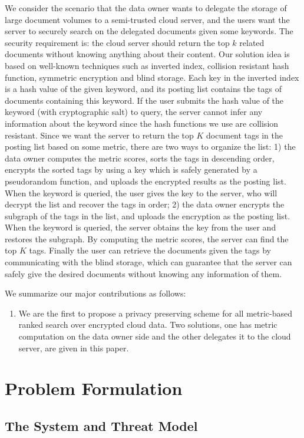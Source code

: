 \documentclass{IEEEtran}
\begin{document}
We consider the scenario that the data owner wants to delegate the storage of large document volumes to a semi-trusted cloud server, and the users want the server to securely search on the delegated documents given some keywords. The security requirement is: the cloud server should return the top $k$ related documents without knowing anything about their content. Our solution idea is based on well-known techniques such as inverted index, collision resistant hash function, symmetric encryption and blind storage. Each key in the inverted index is a hash value of the given keyword, and its posting list contains the tags of documents containing this keyword. If the user submits the hash value of the keyword (with cryptographic salt) to query, the server cannot infer any information about the keyword since the hash functions we use are collision resistant. Since we want the server to return the top $K$ document tags in the posting list based on some metric, there are two ways to organize the list: 1) the data owner computes the metric scores, sorts the tags in descending order, encrypts the sorted tags by using a key which is safely generated by a pseudorandom function, and uploads the encrypted results as the posting list. When the keyword is queried, the user gives the key to the server, who will decrypt the list and recover the tags in order; 2) the data owner encrypts the subgraph of the tags in the list, and uploads the encryption as the posting list. When the keyword is queried, the server obtains the key from the user and restores the subgraph. By computing the metric scores, the server can find the top $K$ tags. Finally the user can retrieve the documents given the tags by communicating with the blind storage, which can guarantee that the server can safely give the desired documents without knowing any information of them.

We summarize our major contributions as follows:
\begin{enumerate}
\item We are the first to propose a privacy preserving scheme for all metric-based ranked search over encrypted cloud data. Two solutions, one has metric computation on the data owner side and the other delegates it to the cloud server, are given in this paper.
\end{enumerate}

\section{Problem Formulation}
\subsection{The System and Threat Model}
\end{document}
